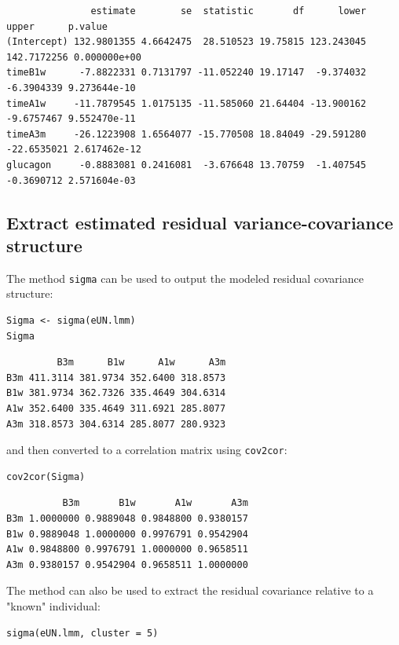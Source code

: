 \documentclass[12pt]{article}
\begin{document}
\begin{verbatim}
               estimate        se  statistic       df      lower       upper      p.value
(Intercept) 132.9801355 4.6642475  28.510523 19.75815 123.243045 142.7172256 0.000000e+00
timeB1w      -7.8822331 0.7131797 -11.052240 19.17147  -9.374032  -6.3904339 9.273644e-10
timeA1w     -11.7879545 1.0175135 -11.585060 21.64404 -13.900162  -9.6757467 9.552470e-11
timeA3m     -26.1223908 1.6564077 -15.770508 18.84049 -29.591280 -22.6535021 2.617462e-12
glucagon     -0.8883081 0.2416081  -3.676648 13.70759  -1.407545  -0.3690712 2.571604e-03
\end{verbatim}

\subsection{Extract estimated residual variance-covariance structure}
\label{sec:org7ed5cb4}

The method \texttt{sigma} can be used to output the modeled residual
covariance structure:
\lstset{language=r,label= ,caption= ,captionpos=b,numbers=none}
\begin{lstlisting}
Sigma <- sigma(eUN.lmm)
Sigma
\end{lstlisting}

\begin{verbatim}
         B3m      B1w      A1w      A3m
B3m 411.3114 381.9734 352.6400 318.8573
B1w 381.9734 362.7326 335.4649 304.6314
A1w 352.6400 335.4649 311.6921 285.8077
A3m 318.8573 304.6314 285.8077 280.9323
\end{verbatim}


and then converted to a correlation matrix using \texttt{cov2cor}:
\lstset{language=r,label= ,caption= ,captionpos=b,numbers=none}
\begin{lstlisting}
cov2cor(Sigma)
\end{lstlisting}

\begin{verbatim}
          B3m       B1w       A1w       A3m
B3m 1.0000000 0.9889048 0.9848800 0.9380157
B1w 0.9889048 1.0000000 0.9976791 0.9542904
A1w 0.9848800 0.9976791 1.0000000 0.9658511
A3m 0.9380157 0.9542904 0.9658511 1.0000000
\end{verbatim}


The method can also be used to extract the residual covariance
relative to a "known" individual:
\lstset{language=r,label= ,caption= ,captionpos=b,numbers=none}
\begin{lstlisting}
sigma(eUN.lmm, cluster = 5)
\end{lstlisting}
\end{document}
